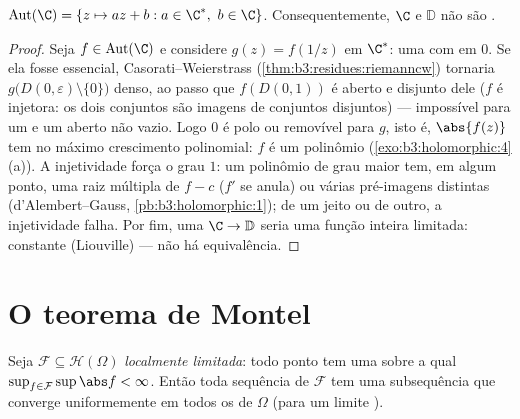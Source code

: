 \begin{theorem}
\label{thm:b3:conformal:autplane}
$\operatorname{Aut}(\C) = \{z \mapsto az + b : a \in \C^*,\ b
\in \C\}$. Consequentemente, $\C$ e $\mathbb D$ não são .
\end{theorem}

\begin{proof}
Seja $f \in \operatorname{Aut}(\C)$ e considere $g(z) =
f(1/z)$ em $\C^*$: uma  com
 em $0$. Se ela fosse essencial,
Casorati--Weierstrass (\cref{thm:b3:residues:riemanncw}) tornaria $g\bigl(D(0,\varepsilon)\setminus\{0\}\bigr)$ denso, ao passo
que $f(D(0, 1))$ é aberto e disjunto dele ($f$ é injetora: os dois conjuntos
são imagens de conjuntos disjuntos) --- impossível para um  e um aberto não vazio. Logo $0$ é polo ou removível para
$g$, isto é, $\abs{f(z)}$ tem no máximo crescimento polinomial: $f$ é um
polinômio (\cref{exo:b3:holomorphic:4}(a)). A injetividade força o grau $1$: um
polinômio de grau maior tem, em algum ponto, uma raiz múltipla de
$f - c$ ($f'$ se anula) ou várias pré-imagens distintas
(d'Alembert--Gauss, \cref{pb:b3:holomorphic:1}); de um jeito ou de outro, a
injetividade falha. Por fim, uma  $\C \to
\mathbb D$ seria uma
função inteira limitada: constante (Liouville) --- não há equivalência.
\end{proof}

\section{O teorema de Montel}

\begin{theorem}[Montel]\label{thm:b3:conformal:montel}
Seja $\mathcal F \subseteq \mathcal H(\Omega)$ \emph{localmente limitada}: todo ponto tem uma 
sobre a qual $\sup_{f\in
\mathcal F}\sup\abs f < \infty$. Então toda sequência de $\mathcal F$ tem uma subsequência
que converge uniformemente em todos os  de $\Omega$ (para
um limite ).
\end{theorem}

